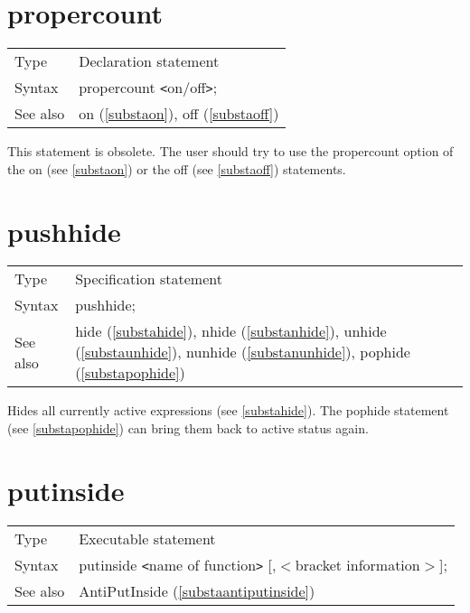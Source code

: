 
\section{propercount}
\label{substapropercount}

\noindent \begin{tabular}{ll}
Type & Declaration statement\\
Syntax & propercount {\tt<}on/off{\tt>};
\\ See also & on (\ref{substaon}), off (\ref{substaoff})
\end{tabular} \vspace{4mm}

\noindent This statement is obsolete. 
The user should try to use the propercount option of the on (see 
\ref{substaon}) or the off (see \ref{substaoff}) statements. 
\vspace{10mm}


\section{pushhide}
\label{substapushhide}

\noindent \begin{tabular}{ll}
Type & Specification statement\\
Syntax & pushhide;
\\ See also & hide (\ref{substahide}),
              nhide (\ref{substanhide}),
              unhide (\ref{substaunhide}),
              nunhide (\ref{substanunhide}),
              pophide (\ref{substapophide})
\end{tabular} \vspace{4mm}

\noindent Hides all currently active 
expressions (see \ref{substahide}). The pophide statement 
(see \ref{substapophide}) can bring them back to active status again. 
\vspace{10mm}


\section{putinside}
\label{substaputinside}

\noindent \begin{tabular}{ll}
Type & Executable statement\\
Syntax & putinside {\tt<}name of function{\tt>} [,$<$bracket information$>$];
\\ See also & AntiPutInside (\ref{substaantiputinside})
\end{tabular}\vspace{4mm}

